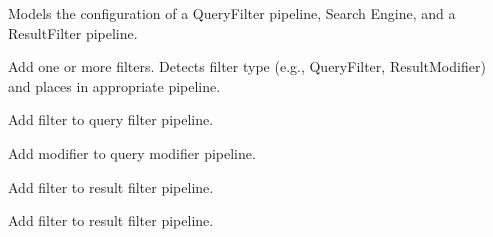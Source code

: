 \documentclass[letterpaper,10pt,english]{sphinxmanual}
\begin{document}
\begin{fulllineitems}
\label{api3.0:puppy.service.SearchService}
Models the configuration of a QueryFilter pipeline, Search Engine, and a ResultFilter pipeline.

\begin{fulllineitems}
\label{api3.0:puppy.service.SearchService.add_filters}
Add one or more filters. Detects filter type (e.g., QueryFilter,
ResultModifier) and places in appropriate pipeline.

\end{fulllineitems}


\begin{fulllineitems}
\label{api3.0:puppy.service.SearchService.add_query_filter}
Add filter to query filter pipeline.

\end{fulllineitems}


\begin{fulllineitems}
\label{api3.0:puppy.service.SearchService.add_query_modifier}
Add modifier to query modifier pipeline.

\end{fulllineitems}


\begin{fulllineitems}
\label{api3.0:puppy.service.SearchService.add_result_filter}
Add filter to result filter pipeline.

\end{fulllineitems}


\begin{fulllineitems}
\label{api3.0:puppy.service.SearchService.add_result_modifier}
Add filter to result filter pipeline.


\end{fulllineitems}
\end{fulllineitems}
\end{document}

